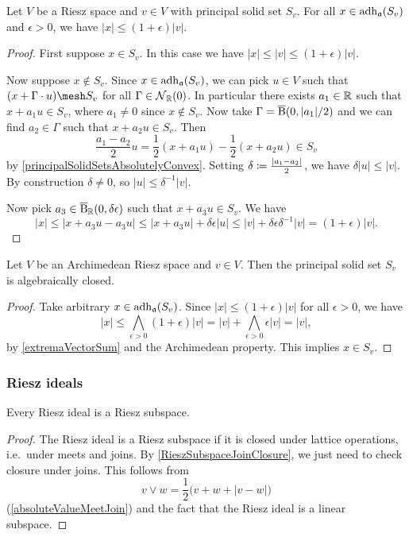 \begin{lemma}
Let $V$ be a Riesz space and $v\in V$ with principal solid set $S_v$. For all $x\in \operatorname{adh}_\mathfrak{a}(S_v)$ and $\epsilon > 0$, we have $|x| \leq (1+\epsilon)|v|$.
\end{lemma}
\begin{proof}
First suppose $x\in S_v$. In this case we have $|x| \leq |v| \leq (1+\epsilon)|v|$.

Now suppose $x\notin S_v$.
Since $x\in \operatorname{adh}_\mathfrak{a}(S_v)$, we can pick $u\in V$ such that $(x+\Gamma \cdot u)\mesh S_v$ for all $\Gamma\in\operatorname{\mathcal{N}}_{\mathbb{R}}(0)$. In particular there exists $a_1\in\mathbb{R}$ such that $x+a_1u \in S_v$, where $a_1 \neq 0$ since $x\notin S_v$. Now take $\Gamma = \operatorname{\overline{B}}(0,|a_1|/2)$ and we can find $a_2\in \Gamma$ such that $x+a_2u \in S_v$. Then
\[ \frac{a_1 - a_2}{2}u = \frac{1}{2}(x+a_1u) - \frac{1}{2}(x+a_2u) \in S_v \]
by \ref{principalSolidSetsAbsolutelyConvex}. Setting $\delta \coloneqq \frac{|a_1 - a_2|}{2}$, we have $\delta |u| \leq |v|$. By construction $\delta \neq 0$, so $|u| \leq \delta^{-1}|v|$.

Now pick $a_3 \in \operatorname{\overline{B}}_{\mathbb{R}}(0,\delta\epsilon)$ such that $x+a_3u \in S_v$. We have
\[ |x| \leq |x+a_3u - a_3u| \leq |x+a_3u|+ \delta\epsilon|u| \leq |v| + \delta\epsilon\delta^{-1}|v| = (1+\epsilon)|v|. \]
\end{proof}
\begin{corollary} \label{principalSolidSetsClosedInArchimedeanRieszSpaces}
Let $V$ be an Archimedean Riesz space and $v\in V$. Then the principal solid set $S_v$ is algebraically closed.
\end{corollary}
\begin{proof}
Take arbitrary $x\in \operatorname{adh}_\mathfrak{a}(S_v)$. Since $|x| \leq (1+\epsilon)|v|$ for all $\epsilon > 0$, we have
\[ |x| \leq \bigwedge_{\epsilon > 0}(1+\epsilon)|v| = |v| + \bigwedge_{\epsilon > 0}\epsilon|v| = |v|, \]
by \ref{extremaVectorSum} and the Archimedean property. This implies $x\in S_v$.
\end{proof}

\subsubsection{Riesz ideals}
\begin{lemma} \label{RieszIdealRieszSubspace}
Every Riesz ideal is a Riesz subspace.
\end{lemma}
\begin{proof}
The Riesz ideal is a Riesz subspace if it is closed under lattice operations, i.e.\ under meets and joins. By \ref{RieszSubspaceJoinClosure}, we just need to check closure under joins. This follows from
\[ v \vee w = \frac{1}{2}\big(v + w + |v-w|\big) \]
(\ref{absoluteValueMeetJoin}) and the fact that the Riesz ideal is a linear subspace.
\end{proof}


